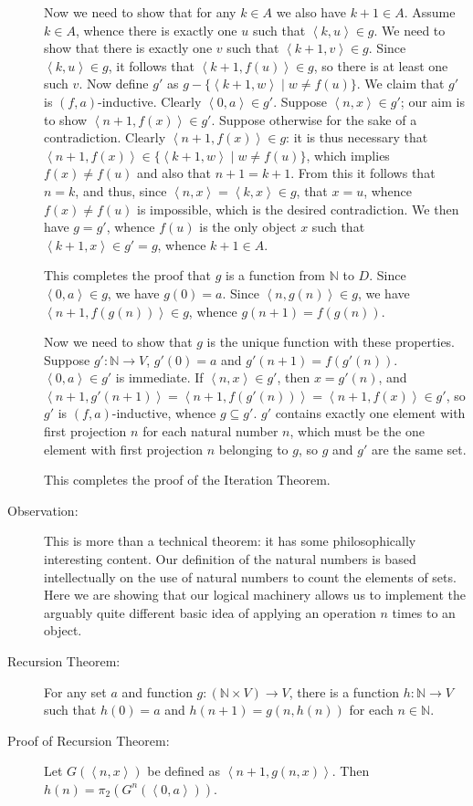 \documentclass[12pt]{book}
\begin{document}
\begin{description}
Now we need to show that for any $k \in A$ we also have $k+1 \in A$.
Assume $k \in A$, whence there is exactly one $u$ such that
$\left<k,u\right> \in g$.  We need to show that there is exactly one
$v$ such that $\left<k+1,v\right> \in g$.  Since $\left<k,u\right> \in
g$, it follows that $\left<k+1,f(u)\right> \in g$, so there is at
least one such $v$.  Now define $g'$ as $g - \{\left<k+1,w\right> \mid
w \neq f(u)\}$.  We claim that $g'$ is $(f,a)$-inductive.  Clearly
$\left<0,a\right> \in g'$.  Suppose $\left<n,x\right> \in g'$; our aim
is to show $\left<n+1,f(x)\right> \in g'$.  Suppose otherwise for the
sake of a contradiction.  Clearly $\left<n+1,f(x)\right> \in g$: it is
thus necessary that $\left<n+1,f(x)\right> \in \{\left<k+1,w\right>
\mid w \neq f(u)\}$, which implies $f(x) \neq f(u)$ and also that
$n+1=k+1$.  From this it follows that $n=k$, and thus, since
$\left<n,x\right> = \left<k,x\right> \in g$, that $x=u$, whence $f(x)
\neq f(u)$ is impossible, which is the desired contradiction.  We then
have $g=g'$, whence $f(u)$ is the only object $x$ such that
$\left<k+1,x\right> \in g' = g$, whence $k+1 \in A$.

This completes the proof that $g$ is a function from ${\mathbb N}$ to
$D$.  Since $\left<0,a\right>\in g$, we have $g(0)=a$.  Since
$\left<n,g(n)\right> \in g$, we have $\left<n+1,f(g(n))\right> \in g$,
whence $g(n+1)=f(g(n))$.

Now we need to show that $g$ is the unique function with these
properties.  Suppose $g':{\mathbb N} \rightarrow V$, $g'(0) = a$ and
$g'(n+1) = f(g'(n))$.  $\left<0,a\right> \in g'$ is immediate.  If
$\left<n,x\right> \in g'$, then $x=g'(n)$, and
$\left<n+1,g'(n+1)\right> = \left<n+1,f(g'(n))\right> =
\left<n+1,f(x)\right> \in g'$, so $g'$ is $(f,a)$-inductive, whence $g
\subseteq g'$.  $g'$ contains exactly one element with first
projection $n$ for each natural number $n$, which must be the one
element with first projection $n$ belonging to $g$, so $g$ and $g'$
are the same set.

This completes the proof of the Iteration Theorem.

\item[Observation:]   This is more than a technical theorem:  it has some philosophically interesting content.   Our definition of the natural numbers
is based intellectually  on the use of natural numbers to count the elements of sets.   Here we are showing that our logical machinery allows us to implement the arguably quite different basic idea of applying an operation $n$ times to an object.

\item[Recursion Theorem:] For any set $a$ and function $g:({\mathbb
N}\times V)\rightarrow V$, there is a function $h:{\mathbb
N}\rightarrow V$ such that $h(0)= a$ and $h(n+1)=g(n,h(n))$ for each
$n \in {\mathbb N}$.

\item[Proof of Recursion Theorem:] Let $G(\left<n,x\right>)$ be defined as
$\left<n+1,g(n,x)\right>$.  Then $h(n) = \pi_2(G^n(\left<0,a\right>))$. 

\end{description}
\end{document}
